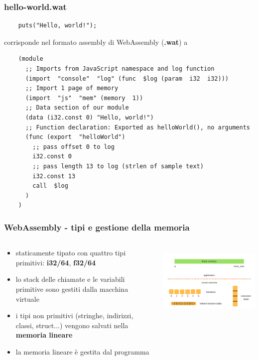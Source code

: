 \documentclass{beamer}
\newcommand\Fontvi{\fontsize{9.5}{7.2}\selectfont}
\begin{document}
\begin{frame}[fragile]
  \frametitle{hello-world.wat}
  \Fontvi
  \begin{verbatim}
    puts("Hello, world!");
  \end{verbatim}

  \vspace{0.2in}
  \centerline{corrisponde nel formato assembly di WebAssembly  (\textbf{.wat}) a}
  \vspace{0.2in}

  \pause

  \begin{verbatim}
    (module
      ;; Imports from JavaScript namespace and log function
      (import  "console"  "log" (func  $log (param  i32  i32)))
      ;; Import 1 page of memory
      (import  "js"  "mem" (memory  1))
      ;; Data section of our module
      (data (i32.const 0) "Hello, world!")
      ;; Function declaration: Exported as helloWorld(), no arguments
      (func (export  "helloWorld")
        ;; pass offset 0 to log
        i32.const 0
        ;; pass length 13 to log (strlen of sample text)
        i32.const 13          
        call  $log
      )
    ) 
  \end{verbatim}
\end{frame}

\begin{frame}
  \frametitle{WebAssembly - tipi e gestione della memoria}
  \begin{columns}
    \begin{column}{0.6\textwidth}
  \begin{itemize}
    \item staticamente tipato con quattro tipi primitivi: \textbf{i32/64},
      \textbf{f32/64}
    \item lo stack delle chiamate e le variabili primitive sono gestiti dalla macchina virtuale
    \pause
    \item i tipi non primitivi (stringhe, indirizzi, classi, struct...) vengono
      salvati nella \textbf{memoria lineare}
    \item la memoria lineare è gestita dal programma
  \end{itemize} 
  \end{column}
  \begin{column}{0.4\textwidth}
  \centerline{\includegraphics[width=10cm,height=3.5cm,keepaspectratio]{images/linmem.png}}
    \end{column}
  \end{columns}
\end{frame}
\end{document}
